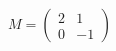 \documentclass[preview]{standalone}
\begin{document}
\begin{align*}
M = \begin{pmatrix} 2 & 1 \\ 0 & -1 \end{pmatrix}
\end{align*}
\end{document}
